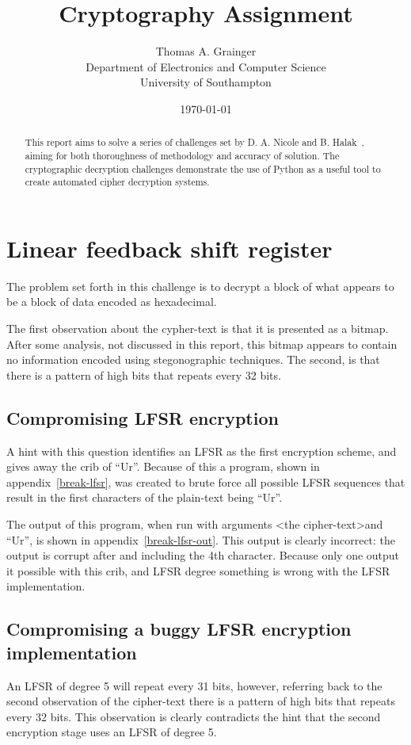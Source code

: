 \documentclass[pdftex, 12pt, a4paper]{article}
\title{Cryptography Assignment}
\author{
        Thomas A. Grainger \\
                Department of Electronics and Computer Science\\
        University of Southampton\\
}
\date{\today}
\begin{document}
\maketitle

\begin{abstract}
This report aims to solve a series of challenges set by D. A. Nicole and B. Halak~\cite{instructions}, aiming for both thoroughness of methodology and accuracy of solution.  The cryptographic decryption challenges demonstrate the use of Python as a useful tool to create automated cipher decryption systems.
\end{abstract}

\tableofcontents
\pagebreak
\section{Linear feedback shift register}

The problem set forth in this challenge is to decrypt a block of what appears to be a block of data encoded as hexadecimal.

The first observation about the cypher-text is that it is presented as a bitmap. After some analysis, not discussed in this report, this bitmap appears to contain no information encoded using stegonographic techniques.  The second, is that there is a pattern of high bits that repeats every 32 bits.

\subsection{Compromising LFSR encryption}
A hint with this question identifies an LFSR as the first encryption scheme, and gives away the crib of ``Ur''.  Because of this a program, shown in appendix~\ref{break-lfsr}, was created to brute force all possible LFSR sequences that result in the first characters of the plain-text being ``Ur''.

The output of this program, when run with arguments \textless{}the cipher-text\textgreater and ``Ur'', is shown in appendix~\ref{break-lfsr-out}.  This output is clearly incorrect: the output is corrupt after and including the 4th character.  Because only one output it possible with this crib, and LFSR degree something is wrong with the LFSR implementation.

\subsection{Compromising a buggy LFSR encryption implementation}
An LFSR of degree 5 will repeat every 31 bits, however, referring back to the second observation of the cipher-text there is a pattern of high bits that repeats every 32 bits. This observation is clearly contradicts the hint that the second encryption stage uses an LFSR of degree 5.
\end{document}
